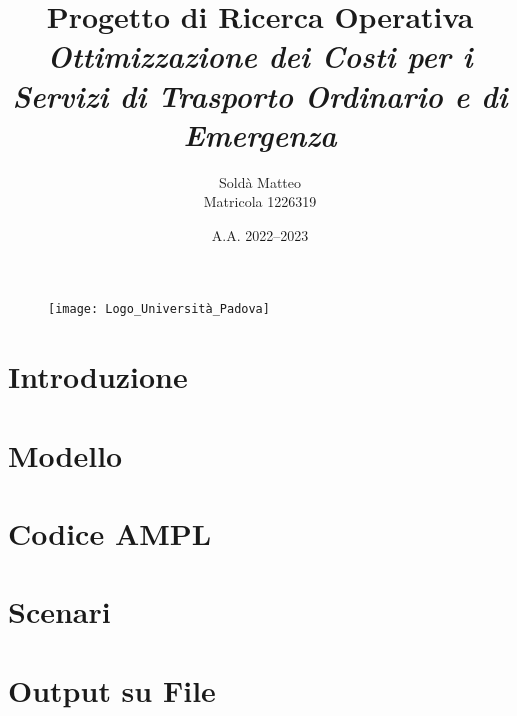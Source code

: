 \documentclass[10pt, a4paper]{article}
\title{%
\textbf{Progetto di Ricerca Operativa} \\ 
\textit{Ottimizzazione dei Costi per i Servizi di Trasporto Ordinario e di Emergenza}
}
\author{Soldà Matteo \\ Matricola 1226319}
\date{A.A. 2022--2023}
\begin{document}
\begin{figure}
    \centering
    \texttt{[image: Logo\_Università\_Padova]}
\end{figure}

\maketitle   

\newpage
\tableofcontents

\newpage
\section{Introduzione}


\newpage
\section{Modello}


\newpage
\section{Codice AMPL}

\newpage
\section{Scenari}


\newpage
\section{Output su File}

\end{document}

